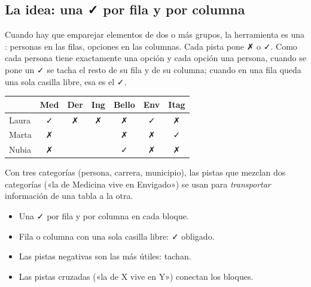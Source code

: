\bitacora


\subsection{La idea: una ✓ por fila y por columna}
Cuando hay que emparejar elementos de dos o más grupos, la herramienta es una : personas en
las filas, opciones en las columnas. Cada pista pone ✗ o ✓. Como cada persona tiene exactamente una opción y cada
opción una persona, cuando se pone un ✓ se tacha el resto de su fila y de su columna; cuando en una fila queda una sola
casilla libre, esa es el ✓.

\begin{center}\small
\begin{tabular}{l|ccc|ccc}
 & Med & Der & Ing & Bello & Env & Itag\\\hline
Laura & ✓ & ✗ & ✗ & ✗ & ✓ & ✗\\
Marta & ✗ &  &  & ✗ & ✗ & ✓\\
Nubia & ✗ &  &  & ✓ & ✗ & ✗\\
\end{tabular}
\end{center}

Con tres categorías (persona, carrera, municipio), las pistas que mezclan dos categorías («la de Medicina vive en
Envigado») se usan para \emph{transportar} información de una tabla a la otra.


\begin{regla}
\begin{itemize}
  \item Una ✓ por fila y por columna en cada bloque.
  \item Fila o columna con una sola casilla libre: ✓ obligado.
  \item Las pistas negativas son las más útiles: tachan.
  \item Las pistas cruzadas («la de X vive en Y») conectan los bloques.
\end{itemize}
\end{regla}

